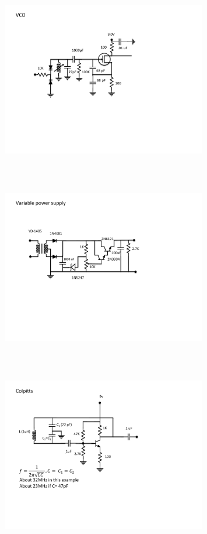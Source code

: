 \begin{figure} 
\center
\includegraphics[width=0.8\textwidth,natwidth=642,natheight=610, height=80mm, width=88mm]{circuit21.pdf}
\end{figure}
\begin{figure} 
\center
\includegraphics[width=0.8\textwidth,natwidth=642,natheight=610, height=80mm, width=88mm]{circuit22.pdf}
\end{figure}
\begin{figure} 
\center
\includegraphics[width=0.8\textwidth,natwidth=642,natheight=610, height=80mm, width=88mm]{circuit23.pdf}
\end{figure}
